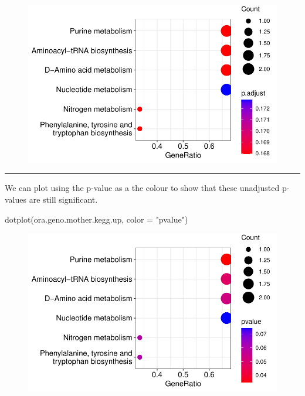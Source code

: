 \documentclass[
  24px,
  letterpaper,
  DIV=11,
  numbers=noendperiod]{scrartcl}
\newenvironment{Shaded}{\begin{snugshade}}{\end{snugshade}}
\newcommand{\AttributeTok}[1]{\textcolor[rgb]{0.40,0.45,0.13}{#1}}
\newcommand{\FunctionTok}[1]{\textcolor[rgb]{0.28,0.35,0.67}{#1}}
\newcommand{\NormalTok}[1]{\textcolor[rgb]{0.00,0.23,0.31}{#1}}
\newcommand{\StringTok}[1]{\textcolor[rgb]{0.13,0.47,0.30}{#1}}
\begin{document}
\begin{figure}[H]

{\centering \includegraphics{index_files/figure-pdf/unnamed-chunk-30-1.pdf}

}

\end{figure}

\begin{center}\rule{0.5\linewidth}{0.5pt}\end{center}

We can plot using the p-value as a the colour to show that these
unadjusted p-values are still significant.

\begin{Shaded}
\begin{Highlighting}[]
\FunctionTok{dotplot}\NormalTok{(ora.geno.mother.kegg.up, }\AttributeTok{color =} \StringTok{"pvalue"}\NormalTok{)}
\end{Highlighting}
\end{Shaded}

\begin{figure}[H]

{\centering \includegraphics{index_files/figure-pdf/unnamed-chunk-31-1.pdf}

}

\end{figure}
\end{document}
